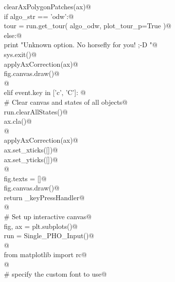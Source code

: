\documentclass[12pt, english, oneside]{report}
\begin{document}
\begin{appendices}
\begin{flushleft}
\begin{list}{}{}
\mbox{}\verb@                    clearAxPolygonPatches(ax)@\\
\mbox{}\verb@                    if   algo_str == 'odw':@\\
\mbox{}\verb@                          tour = run.get_tour( algo_odw, plot_tour_p=True )@\\
\mbox{}\verb@                    else:@\\
\mbox{}\verb@                          print "Unknown option. No horsefly for you! ;-D "@\\
\mbox{}\verb@                          sys.exit()@\\
\mbox{}\verb@                    applyAxCorrection(ax)@\\
\mbox{}\verb@                    fig.canvas.draw()@\\
\mbox{}\verb@                    @\\
\mbox{}\verb@               elif event.key in ['c', 'C']: @\\
\mbox{}\verb@                    # Clear canvas and states of all objects@\\
\mbox{}\verb@                    run.clearAllStates()@\\
\mbox{}\verb@                    ax.cla()@\\
\mbox{}\verb@                                  @\\
\mbox{}\verb@                    applyAxCorrection(ax)@\\
\mbox{}\verb@                    ax.set_xticks([])@\\
\mbox{}\verb@                    ax.set_yticks([])@\\
\mbox{}\verb@                                     @\\
\mbox{}\verb@                    fig.texts = []@\\
\mbox{}\verb@                    fig.canvas.draw()@\\
\mbox{}\verb@           return _keyPressHandler@\\
\mbox{}\verb@    @\\
\mbox{}\verb@    # Set up interactive canvas@\\
\mbox{}\verb@    fig, ax =  plt.subplots()@\\
\mbox{}\verb@    run = Single_PHO_Input()@\\
\mbox{}\verb@        @\\
\mbox{}\verb@    from matplotlib import rc@\\
\mbox{}\verb@    @\\
\mbox{}\verb@    # specify the custom font to use@\\

\end{list}
\end{flushleft}
\end{appendices}
\end{document}
